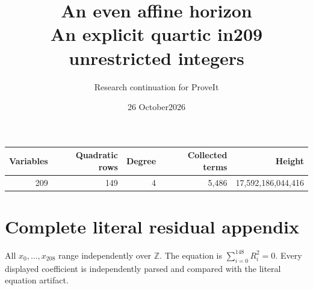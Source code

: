 \documentclass[11pt]{article}
\title{An even affine horizon\\\large An explicit quartic in209 unrestricted integers}
\author{Research continuation for ProveIt}
\date{26 October2026}
\begin{document}
\maketitle
\begin{center}
\begin{tabular}{rrrrr}
Variables&Quadratic rows&Degree&Collected terms&Height\\\midrule
209&149&4&5,486&17,592,186,044,416
\end{tabular}
\end{center}

\clearpage
\section{Complete literal residual appendix}
All $x_0,\ldots,x_{208}$ range independently over $\mathbb Z$. The equation is
$\sum_{i=0}^{148}R_i^2=0$. Every displayed coefficient is independently parsed
and compared with the literal equation artifact.
\begingroup\scriptsize\allowdisplaybreaks

\endgroup
\end{document}
